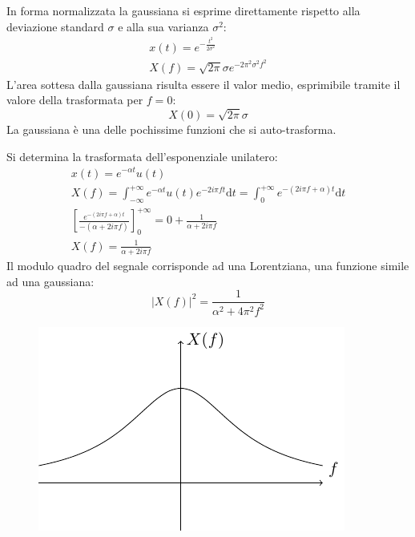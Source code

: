 \documentclass{article}
\newcommand{\df}{\mathrm{d}}
\numberwithin{equation}{subsection}
\begin{document}
In forma normalizzata la gaussiana si esprime direttamente rispetto alla deviazione standard $\sigma$ e alla sua varianza $\sigma^2$:
\begin{gather*}
    x(t)=e^{-\frac{t^2}{2\sigma^2}}\\
    X(f)=\sqrt{2\pi}\sigma e^{-2\pi^2\sigma^2f^2}
\end{gather*}
L'area sottesa dalla gaussiana risulta essere il valor medio, esprimibile tramite il valore della trasformata per $f=0$:
\begin{equation*}
    X(0)=\sqrt{2\pi}\sigma
\end{equation*}
La gaussiana è una delle pochissime funzioni che si auto-trasforma. 

Si determina la trasformata dell'esponenziale unilatero:
\begin{gather*}
    x(t)=e^{-\alpha t}u(t)\\
    X(f)=\displaystyle\int_{-\infty}^{+\infty}e^{-\alpha t}u(t)e^{-2i\pi ft}\df t=\int_0^{+\infty}e^{-(2i\pi f+\alpha)t}\df t\\
    \left[\displaystyle\frac{e^{-(2i\pi f+\alpha)t}}{-(\alpha+2i\pi f)}\right]^{+\infty}_0=0+\frac{1}{\alpha+2i\pi f}\\
    X(f)=\frac{1}{\alpha+ 2i\pi f}
\end{gather*}
Il modulo quadro del segnale corrisponde ad una Lorentziana, una funzione simile ad una gaussiana: 
\begin{equation*}
    \left|X(f)\right|^2=\frac{1}{\alpha^2+4\pi^2f^2}
\end{equation*}
\begin{figure}[H]%
    \centering
    \includegraphics{lorentziana.pdf}%
\end{figure}
\end{document}
